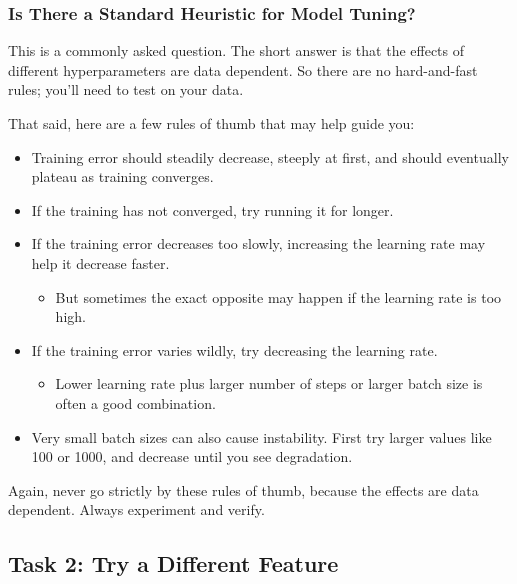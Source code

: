 \documentclass[11pt]{article}
\providecommand{\tightlist}{%
      \setlength{\itemsep}{0pt}\setlength{\parskip}{0pt}}
\begin{document}
    \hypertarget{is-there-a-standard-heuristic-for-model-tuning}{%
\subsubsection{Is There a Standard Heuristic for Model
Tuning?}\label{is-there-a-standard-heuristic-for-model-tuning}}

This is a commonly asked question. The short answer is that the effects
of different hyperparameters are data dependent. So there are no
hard-and-fast rules; you'll need to test on your data.

That said, here are a few rules of thumb that may help guide you:

\begin{itemize}
\tightlist
\item
  Training error should steadily decrease, steeply at first, and should
  eventually plateau as training converges.
\item
  If the training has not converged, try running it for longer.
\item
  If the training error decreases too slowly, increasing the learning
  rate may help it decrease faster.

  \begin{itemize}
  \tightlist
  \item
    But sometimes the exact opposite may happen if the learning rate is
    too high.
  \end{itemize}
\item
  If the training error varies wildly, try decreasing the learning rate.

  \begin{itemize}
  \tightlist
  \item
    Lower learning rate plus larger number of steps or larger batch size
    is often a good combination.
  \end{itemize}
\item
  Very small batch sizes can also cause instability. First try larger
  values like 100 or 1000, and decrease until you see degradation.
\end{itemize}

Again, never go strictly by these rules of thumb, because the effects
are data dependent. Always experiment and verify.

    \hypertarget{task-2-try-a-different-feature}{%
\subsection{Task 2: Try a Different
Feature}\label{task-2-try-a-different-feature}}
\end{document}
